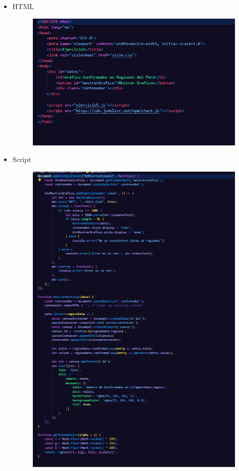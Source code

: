 \documentclass{article}
\begin{document}
	\begin{itemize}
		\item HTML
		\begin{figure}[H]
			\centering
			\includegraphics[width=1.0\textwidth,keepaspectratio]{img/Ejer5T2HTML.jpg}
		\end{figure}
		\item Script
		\begin{figure}[H]
			\centering
			\includegraphics[width=1.0\textwidth,keepaspectratio]{img/Ejer5T2Sript.jpg}

\end{figure}
\end{itemize}
\end{document}
